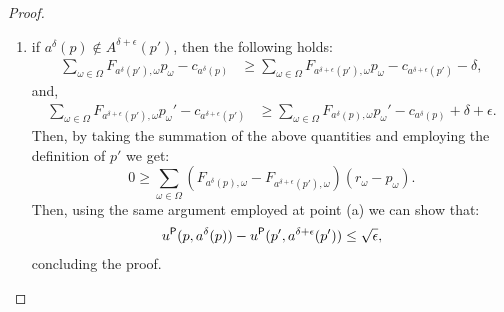 \begin{proof}
\begin{enumerate}
\begin{enumerate}
			
			\item if $a^\delta(p) \not\in {A}^{\delta+\epsilon}(p')$, then the following holds:
			\begin{align*}	
				\sum_{\omega \in \Omega} F_{ a^{\delta}(p'),\omega} p_\omega - c_{ a^{\delta}(p)} & \ge \sum_{\omega \in \Omega} F_{ a^{\delta+\epsilon}(p'),\omega} p_\omega - c_{ a^{\delta+\epsilon}(p')} - {\delta },
			\end{align*}
			and, 
			\begin{align*}	
				\sum_{\omega \in \Omega}F_{ a^{\delta+\epsilon}(p'),\omega} p_\omega' - c_{ a^{\delta+\epsilon}(p')}  & \ge \sum_{\omega \in \Omega} F_{ a^{\delta}(p),\omega} p_\omega' - c_{ a^{\delta}(p)} + \delta +\epsilon.
			\end{align*}
			Then, by taking the summation of the above quantities and employing the definition of $p'$  we get:
			\begin{equation*}	
				0 \ge \sum_{\omega \in \Omega} (F_{ a^{\delta}(p),\omega} - F_{ a^{\delta+\epsilon}(p'),\omega}) (r_\omega-p_\omega).
			\end{equation*}
			Then, using the same argument employed at point (a) we can show that:
			\begin{align*}	
				u^{\mathsf{P}} (p,a^{\delta}(p))  - u^{\mathsf{P}} (p',a^{\delta+\epsilon}(p')) \le  \sqrt{\epsilon},
			\end{align*}
			concluding the proof.
		\end{enumerate}
	\end{enumerate}
\end{proof}

%
%
%
%
%
%
%
%

